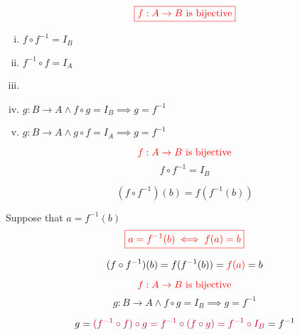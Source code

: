 \begin{frame}{}
  \begin{theorem}[]
    \[
      \textcolor{red}{\boxed{f: A \to B \text{ is bijective}}}
    \]

    \begin{enumerate}[(i)]
      \item $f \circ f^{-1} = I_B$
      \item $f^{-1} \circ f = I_A$
      \vspace{0.30cm}
      \item {}
      \vspace{0.30cm}
      \item $g: B \to A \land f \circ g = I_B \implies g = f^{-1}$
      \item $g: B \to A \land g \circ f = I_A \implies g = f^{-1}$
    \end{enumerate}
  \end{theorem}

  \pause
  \vspace{0.30cm}
  \begin{center}
  \end{center}
\end{frame}

\begin{frame}{}
  \begin{theorem}
    \[
      \textcolor{red}{f: A \to B \text{ is bijective}}
    \]
    \[
      f \circ f^{-1} = I_{B}
    \]
  \end{theorem}

  \pause
  \vspace{0.30cm}
  \[
    (f \circ f^{-1})(b) = f(f^{-1}(b))
  \]
  \pause
  \begin{center}
    Suppose that $a = f^{-1}(b)$
    \[
      \textcolor{red}{\boxed{a = f^{-1}(b) \iff f(a) = b}}
    \]
  \end{center}

  \pause
  \[
    (f \circ f^{-1})(b) = f(f^{-1}(b)) = \textcolor{red}{f(a)} = b
  \]
\end{frame}

\begin{frame}{}
  \begin{theorem}
    \[
      \textcolor{red}{f: A \to B \text{ is bijective}}
    \]
    \[
      g: B \to A \land f \circ g = I_B \implies g = f^{-1}
    \]
  \end{theorem}

  \pause
  \[
    g = \textcolor{purple}{(f^{-1} \circ f) \circ g = f^{-1} \circ (f \circ g) = f^{-1} \circ I_B} = f^{-1}
  \]
\end{frame}

